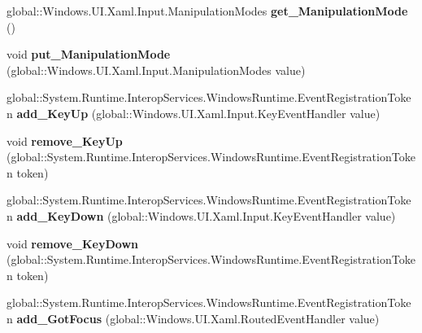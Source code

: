 \begin{DoxyCompactItemize}
global\+::\+Windows.\+U\+I.\+Xaml.\+Input.\+Manipulation\+Modes {\bfseries get\+\_\+\+Manipulation\+Mode} ()
\item 
\mbox{\label{interface_windows_1_1_u_i_1_1_xaml_1_1_i_u_i_element_ae026809f65653a37cd75df9589dc5e90}} 
void {\bfseries put\+\_\+\+Manipulation\+Mode} (global\+::\+Windows.\+U\+I.\+Xaml.\+Input.\+Manipulation\+Modes value)
\item 
\mbox{\label{interface_windows_1_1_u_i_1_1_xaml_1_1_i_u_i_element_abae2e6510442e3bf03b0abd24270a3e7}} 
global\+::\+System.\+Runtime.\+Interop\+Services.\+Windows\+Runtime.\+Event\+Registration\+Token {\bfseries add\+\_\+\+Key\+Up} (global\+::\+Windows.\+U\+I.\+Xaml.\+Input.\+Key\+Event\+Handler value)
\item 
\mbox{\label{interface_windows_1_1_u_i_1_1_xaml_1_1_i_u_i_element_a5d62f2ed59084c31013a2397faab0314}} 
void {\bfseries remove\+\_\+\+Key\+Up} (global\+::\+System.\+Runtime.\+Interop\+Services.\+Windows\+Runtime.\+Event\+Registration\+Token token)
\item 
\mbox{\label{interface_windows_1_1_u_i_1_1_xaml_1_1_i_u_i_element_a06c59188c0e071badb5405f835fbedd1}} 
global\+::\+System.\+Runtime.\+Interop\+Services.\+Windows\+Runtime.\+Event\+Registration\+Token {\bfseries add\+\_\+\+Key\+Down} (global\+::\+Windows.\+U\+I.\+Xaml.\+Input.\+Key\+Event\+Handler value)
\item 
\mbox{\label{interface_windows_1_1_u_i_1_1_xaml_1_1_i_u_i_element_ae7fc7bcada32e7e554fd3685ee2e4022}} 
void {\bfseries remove\+\_\+\+Key\+Down} (global\+::\+System.\+Runtime.\+Interop\+Services.\+Windows\+Runtime.\+Event\+Registration\+Token token)
\item 
\mbox{\label{interface_windows_1_1_u_i_1_1_xaml_1_1_i_u_i_element_a96e9e3b3d2456f96d2113018911c4223}} 
global\+::\+System.\+Runtime.\+Interop\+Services.\+Windows\+Runtime.\+Event\+Registration\+Token {\bfseries add\+\_\+\+Got\+Focus} (global\+::\+Windows.\+U\+I.\+Xaml.\+Routed\+Event\+Handler value)

\end{DoxyCompactItemize}
